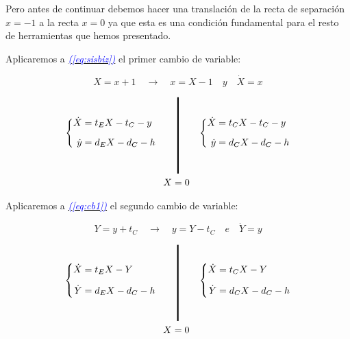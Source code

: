 \documentclass[12pt,a4paper]{report} %
\newcommand{\eref}[1]{\hyperref[#1]{\textcolor{blue}{\textit{(\ref*{#1})}}}}
\begin{document}
	 \vspace{0.5cm}\noindent Pero antes de continuar debemos hacer una translación de la recta de separación $x=-1$ a la recta $x=0$ ya que esta es una condición fundamental para el resto de herramientas que hemos presentado.
	
	\newpage
	
	\vspace{0.5cm}\noindent Aplicaremos a \eref{eq:sisbiz} el primer cambio de variable:
	
	\begin{equation}
		\label{eq:cambioo1}
		X=x+1 \quad \longrightarrow \quad x=X-1 \quad \textit{y} \quad \dot{X}=x
	\end{equation}
	
	\begin{equation}
		\label{eq:cb1}
		\begin{gathered}
			\left\{
			\begin{aligned}
				\dot{X}&=t_EX-t_C-y
				\\[2mm]
				\dot{y}&=d_EX-d_C-h
			\end{aligned}
			\right. \qquad 
			\rule[-40pt]{1.5pt}{80pt} \qquad 
			\left\{
			\begin{aligned}
				\dot{X}&=t_CX-t_C-y
				\\[2mm]
				\dot{y}&=d_CX-d_C-h
			\end{aligned}
			\right. \\  \!\! X=0
		\end{gathered}
	\end{equation}\smallskip
	
	\vspace{0.5cm}\noindent Aplicaremos a \eref{eq:cb1} el segundo cambio de variable:
	
	\begin{equation}
		\label{eq:cambioo2}
		Y=y+t_C \quad \longrightarrow \quad y=Y-t_C \quad \textit{e} \quad \dot{Y}=y
	\end{equation}
	
	\begin{equation}
		\label{eq:cb2}
		\begin{gathered}
			\left\{
			\begin{aligned}
				\dot{X}&=t_EX-Y
				\\[2mm]
				\dot{Y}&=d_EX-d_C-h
			\end{aligned}
			\right. \qquad 
			\rule[-40pt]{1.5pt}{80pt} \qquad 
			\left\{
			\begin{aligned}
				\dot{X}&=t_CX-Y
				\\[2mm]
				\dot{Y}&=d_CX-d_C-h
			\end{aligned}
			\right. \\  \!\! X=0
		\end{gathered}
	\end{equation}\smallskip
	
\end{document}

